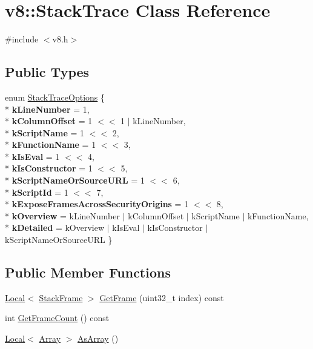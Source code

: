 \hypertarget{classv8_1_1_stack_trace}{}\section{v8\+:\+:Stack\+Trace Class Reference}
\label{classv8_1_1_stack_trace}


{\ttfamily \#include $<$v8.\+h$>$}

\subsection*{Public Types}
\begin{DoxyCompactItemize}
\item 
enum \hyperlink{classv8_1_1_stack_trace_a9704e4a37949eb8eb8ccddbddf161492}{Stack\+Trace\+Options} \{ \\*
{\bfseries k\+Line\+Number} = 1, 
\\*
{\bfseries k\+Column\+Offset} = 1 $<$$<$ 1 $\vert$ k\+Line\+Number, 
\\*
{\bfseries k\+Script\+Name} = 1 $<$$<$ 2, 
\\*
{\bfseries k\+Function\+Name} = 1 $<$$<$ 3, 
\\*
{\bfseries k\+Is\+Eval} = 1 $<$$<$ 4, 
\\*
{\bfseries k\+Is\+Constructor} = 1 $<$$<$ 5, 
\\*
{\bfseries k\+Script\+Name\+Or\+Source\+U\+RL} = 1 $<$$<$ 6, 
\\*
{\bfseries k\+Script\+Id} = 1 $<$$<$ 7, 
\\*
{\bfseries k\+Expose\+Frames\+Across\+Security\+Origins} = 1 $<$$<$ 8, 
\\*
{\bfseries k\+Overview} = k\+Line\+Number $\vert$ k\+Column\+Offset $\vert$ k\+Script\+Name $\vert$ k\+Function\+Name, 
\\*
{\bfseries k\+Detailed} = k\+Overview $\vert$ k\+Is\+Eval $\vert$ k\+Is\+Constructor $\vert$ k\+Script\+Name\+Or\+Source\+U\+RL
 \}
\end{DoxyCompactItemize}
\subsection*{Public Member Functions}
\begin{DoxyCompactItemize}
\item 
\hyperlink{classv8_1_1_local}{Local}$<$ \hyperlink{classv8_1_1_stack_frame}{Stack\+Frame} $>$ \hyperlink{classv8_1_1_stack_trace_a6fd5ba809b5d87032d70d32f0b1a80e8}{Get\+Frame} (uint32\+\_\+t index) const 
\item 
int \hyperlink{classv8_1_1_stack_trace_aafafebce6c034f1f6f4a870e8f52431e}{Get\+Frame\+Count} () const 
\item 
\hyperlink{classv8_1_1_local}{Local}$<$ \hyperlink{classv8_1_1_array}{Array} $>$ \hyperlink{classv8_1_1_stack_trace_abd36f712b3ab986b572aa259b06bf5bd}{As\+Array} ()
\end{DoxyCompactItemize}

